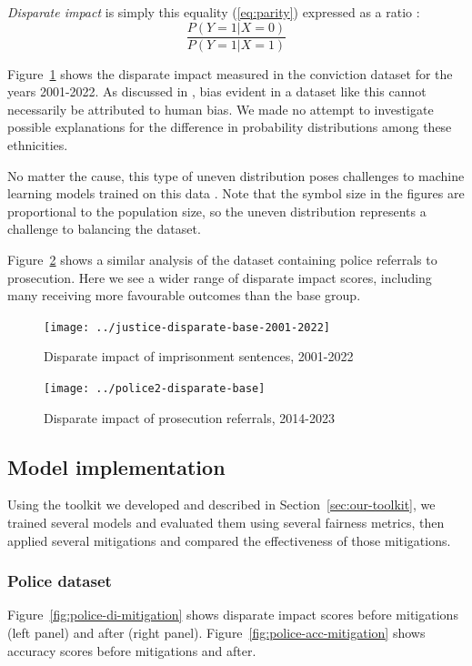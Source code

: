 \documentclass[runningheads]{llncs}
\begin{document}
\emph{Disparate impact} is simply this equality (\ref{eq:parity})
expressed as a ratio \cite{feldman2015certifying}:
\begin{equation}
    \label{eq:disparate-impact}
    \frac{P(Y = 1 | X = 0)}{P(Y = 1 | X = 1)}
\end{equation}

Figure~\ref{fig:justice-di} shows the disparate impact measured in the
conviction dataset for the years 2001-2022. As discussed in
\cite{chouldechova2017fair,mehrabi2021survey}, bias evident in a
dataset like this cannot necessarily be attributed to human bias. We
made no attempt to investigate possible explanations for the
difference in probability distributions among these ethnicities.

No matter the cause, this type of uneven distribution poses challenges
to machine learning models trained on this data
\cite{feldman2015certifying}. Note that the symbol size in the figures
are proportional to the population size, so the uneven distribution
represents a challenge to balancing the dataset.

Figure~\ref{fig:police-di} shows a similar analysis of the dataset
containing police referrals to prosecution. Here we see a wider range
of disparate impact scores, including many receiving more favourable
outcomes than the base group.

\begin{figure}
    \centering
    \texttt{[image: ../justice-disparate-base-2001-2022]}
    \caption{Disparate impact of imprisonment sentences, 2001-2022}
    \label{fig:justice-di}
\end{figure}
\begin{figure}
    \centering
    \texttt{[image: ../police2-disparate-base]}
    \caption{Disparate impact of prosecution referrals, 2014-2023}
    \label{fig:police-di}
\end{figure}


\subsection{Model implementation}
\label{sec:model-implementation}
Using the toolkit we developed and described in
Section~\ref{sec:our-toolkit}, we trained several models and evaluated
them using several fairness metrics, then applied several mitigations
and compared the effectiveness of those mitigations.

\subsubsection{Police dataset}
Figure~\ref{fig:police-di-mitigation} shows disparate impact scores
before mitigations (left panel) and after (right panel).
Figure~\ref{fig:police-acc-mitigation} shows accuracy scores before
mitigations and after.
\end{document}
